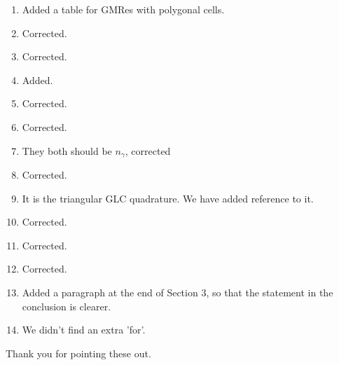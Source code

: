 \documentclass{article}
\begin{document}
\begin{enumerate}
\item Added a table for GMRes with polygonal cells.
\item Corrected.
\item Corrected.
\item Added.
\item Corrected.
\item Corrected.
\item They both should be $n_\gamma$, corrected
\item Corrected.
\item It is the triangular GLC quadrature. We have added reference to it.
\item Corrected.
\item Corrected.
\item Corrected.
\item Added a paragraph at the end of Section 3, so that the statement in the conclusion is clearer.
\item We didn't find an extra 'for'.
\end{enumerate}

\noindent 
Thank you for pointing these out.
\end{document}
